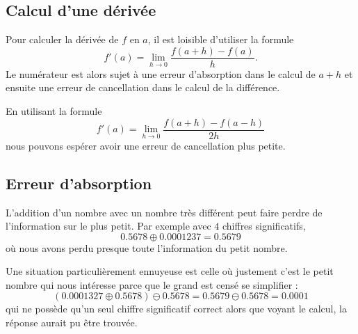 \subsection{Calcul d'une dérivée}

Pour calculer la dérivée de \( f\) en \( a\), il est loisible d'utiliser la formule
\begin{equation}
    f'(a)=\lim_{h\to 0} \frac{ f(a+h)-f(a) }{ h }.
\end{equation}
Le numérateur est alors sujet à une erreur d'absorption dans le calcul de \( a+h\) et ensuite une erreur de cancellation dans le calcul de la différence.

En utilisant la formule
\begin{equation}
    f'(a)=\lim_{h\to 0} \frac{ f(a+h)-f(a-h) }{ 2h }
\end{equation}
nous pouvons espérer avoir une erreur de cancellation plus petite.


\subsection{Erreur d'absorption}

L'addition d'un nombre avec un nombre très différent peut faire perdre de l'information sur le plus petit. Par exemple avec \( 4\) chiffres significatifs,
\begin{equation}
    0.5678\oplus 0.0001237=0.5679
\end{equation}
où nous avons perdu presque toute l'information du petit nombre.

Une situation particulièrement ennuyeuse est celle où justement c'est le petit nombre qui nous intéresse parce que le grand est censé se simplifier : 
\begin{equation}
    (0.0001327\oplus 0.5678)\ominus 0.5678=0.5679\ominus 0.5678=0.0001
\end{equation}
qui ne possède qu'un seul chiffre significatif correct alors que voyant le calcul, la réponse aurait pu être trouvée.

